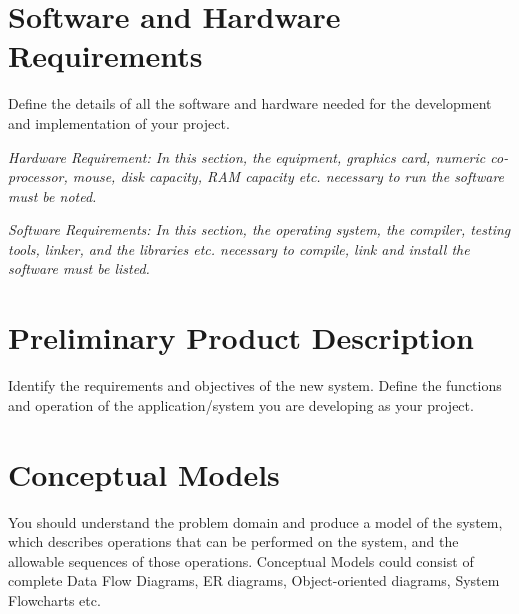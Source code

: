 \section{Software and Hardware Requirements}
Define the details of all the software and hardware needed for the development and implementation of your project.

\textit{Hardware Requirement: In this section, the equipment, graphics card, numeric co-processor, mouse, disk capacity, RAM capacity etc. necessary to run the software must be noted.}

\textit{Software Requirements: In this section, the operating system, the compiler, testing tools, linker, and the libraries etc. necessary to compile, link and install the software must be listed.}

\section{Preliminary Product Description}
Identify the requirements and objectives of the new system. Define the functions and operation of the application/system you are developing as your project.

\section{Conceptual Models}
You should understand the problem domain and produce a model of the system, which describes operations that can be performed on the system, and the allowable sequences of those operations. Conceptual Models could consist of complete Data Flow Diagrams, ER diagrams, Object-oriented diagrams, System Flowcharts etc.
